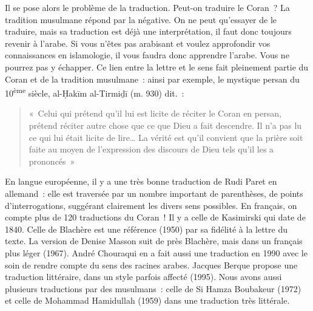Il se pose alors le problème de la traduction. Peut-on traduire le
Coran~? La tradition musulmane répond par la négative. On ne peut
qu'essayer de le traduire, mais sa traduction est déjà une
interprétation, il faut donc toujours revenir à l'arabe. Si vous n'êtes
pas arabisant et voulez approfondir vos connaissances en islamologie, il
vous faudra donc apprendre l'arabe. Vous ne pourrez pas y échapper. Ce
lien entre la lettre et le sens fait pleinement partie du Coran et de la
tradition musulmane~: ainsi par exemple, le mystique persan du
10\textsuperscript{ème} siècle, al-Ḥakīm al-Tirmiḏī (m. 930) dit.~:
\begin{quote}
    «~Celui qui prétend qu'il lui est licite de réciter le Coran en persan,
prétend réciter autre chose que ce que Dieu a fait descendre. Il n'a pas
lu ce qui lui était licite de lire\ldots{} La vérité est qu'il convient
que la prière soit faite au moyen de l'expression des discours de Dieu
tels qu'il les a prononcés~»
\end{quote}




{En langue européenne, il y a une très bonne traduction de
Rudi Paret en allemand~: elle est traversée par un nombre important de
parenthèses, de points d'interrogations, suggérant clairement les divers
sens possibles. En français, on compte plus de 120 traductions du
Coran~! Il y a celle de Kasimirski qui date de 1840. Celle de Blachère
est une référence (1950) par sa fidélité à la lettre du texte. La
version de Denise Masson suit de près Blachère, mais dans un français
plus léger (1967). André Chouraqui en a fait aussi une traduction en
1990 avec le soin de rendre compte du sens des racines arabes. Jacques
Berque propose une traduction littéraire, dans un style parfois affecté
(1995). Nous avons aussi plusieurs traductions par des musulmans~: celle
de Si Hamza Boubakeur (1972) et celle de Mohammad Hamidullah (1959) dans
une traduction très
littérale.}
\FloatBarrier
{}

